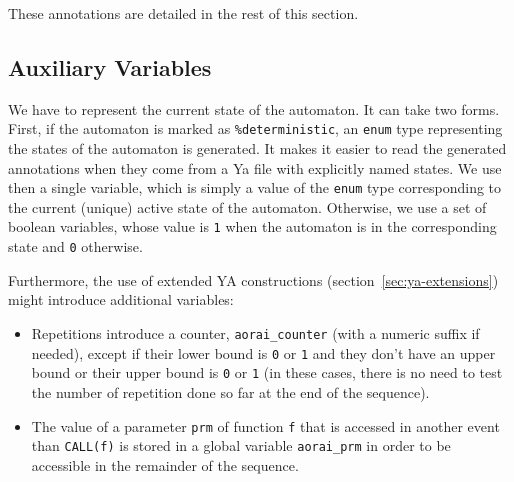 \documentclass{frama-c-book}
\begin{document}
These annotations are detailed in the rest of this section.

\subsection{Auxiliary Variables}
\label{SectGeneratedVariables}
\lstset{language=C}

We have to represent the current state of the automaton.
It can take two forms. First, if the automaton is marked as
{\lstset{language=ya}\lstinline|%deterministic|},
an \lstinline|enum| type representing the states of the automaton is
generated. It makes it easier to read the generated annotations when they
come from a Ya file with explicitly named states.
We use then a single variable,
\curStates which is simply a value of the \lstinline|enum| type corresponding
to the current (unique) active state of the automaton.
Otherwise, we use a set of boolean variables, whose value is
\lstinline|1| when the automaton is in the corresponding state and
\lstinline|0| otherwise.

Furthermore, the use of extended YA constructions
(section~\ref{sec:ya-extensions}) might introduce additional variables:
\begin{itemize}
\item Repetitions introduce a counter, \lstinline|aorai_counter| (with a numeric
suffix if needed), except if their lower bound is \lstinline|0| or
\lstinline|1| and they don't have an upper bound or their upper bound is
\lstinline|0| or \lstinline|1| (in these cases, there is no need to
test the number of repetition done so far at the end of the sequence).
\item The value of a parameter \lstinline|prm| of function \lstinline|f|
that is accessed in another event than \lstinline|CALL(f)| is stored in a global
variable \lstinline|aorai_prm| in order to be accessible in the remainder of the
sequence.
\end{itemize}

\end{document}
